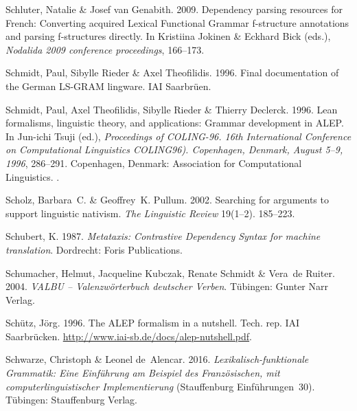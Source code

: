 \begin{thebibliography}{1420}
Schluter, Natalie \& Josef van Genabith. 2009.
\newblock Dependency parsing resources for {French}: {Converting} acquired
  {Lexical Functional Grammar} f-structure annotations and parsing f-structures
  directly.
\newblock In Kristiina Jokinen \& Eckhard Bick (eds.), \emph{Nodalida 2009
  conference proceedings}, 166--173.

Schmidt, Paul, Sibylle Rieder \& Axel Theofilidis. 1996{}.
\newblock Final documentation of the {German} {LS-GRAM} lingware.
 IAI
  Saar\-br{\"u}en.

Schmidt, Paul, Axel Theofilidis, Sibylle Rieder \& Thierry Declerck.
  1996{}.
\newblock Lean formalisms, linguistic theory, and applications: Grammar
  development in {ALEP}.
\newblock In {Jun-ichi} Tsuji (ed.), \emph{Proceedings of {COLING-96. 16th
  International Conference on Computational Linguistics COLING96). Copenhagen,
  Denmark, August 5--9, 1996}}, 286--291. Copenhagen, Denmark: Association for
  Computational Linguistics.
\newblock {}.

Scholz, Barbara~C. \& Geoffrey~K. Pullum. 2002.
\newblock Searching for arguments to support linguistic nativism.
\newblock \emph{The Linguistic Review} 19(1--2). 185--223.

Schubert, K. 1987.
\newblock \emph{Metataxis: {Contrastive} {Dependency Syntax} for machine
  translation}.
\newblock Dordrecht: Foris Publications.

Schumacher, Helmut, Jacqueline Kubczak, Renate Schmidt \& Vera~de Ruiter. 2004.
\newblock \emph{{VALBU -- Valenzw{\"o}rterbuch deutscher Verben}}.
\newblock T{\"u}bingen: Gunter Narr Verlag.

Sch{\"u}tz, J{\"o}rg. 1996.
\newblock The {ALEP} formalism in a nutshell.
\newblock Tech. rep. IAI Saarbr{\"u}cken.
\newblock \urlprefix\url{http://www.iai-sb.de/docs/alep-nutshell.pdf}.

Schwarze, Christoph \& Leonel de~Alencar. 2016.
\newblock \emph{{Lexikalisch-funktionale Grammatik: Eine Einf{\"u}hrung am
  Beispiel des Franz{\"o}sischen, mit computerlinguistischer Implementierung}}
  (Stauffenburg Einf{\"u}hrungen~30).
\newblock T\"u\-bing\-en: Stauffenburg Verlag.


\end{thebibliography}
